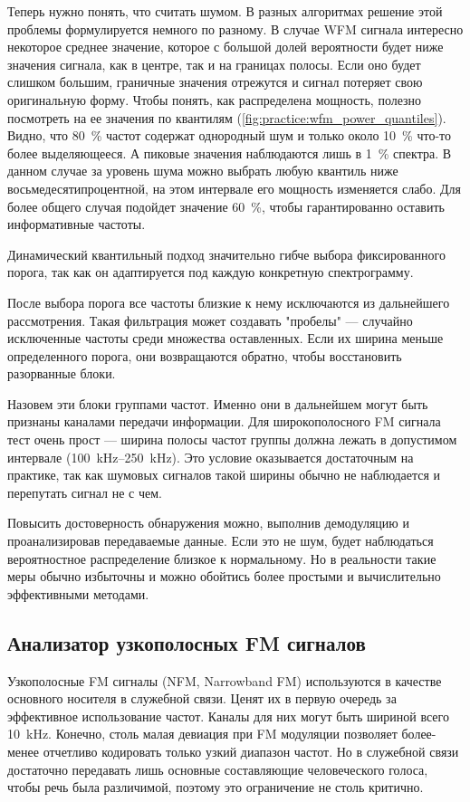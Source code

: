 Теперь нужно понять, что считать шумом. В разных алгоритмах решение этой проблемы формулируется немного по разному. В случае WFM сигнала интересно некоторое среднее значение, которое с большой долей вероятности будет ниже значения сигнала, как в центре, так и на границах полосы. Если оно будет слишком большим, граничные значения отрежутся и сигнал потеряет свою оригинальную форму. Чтобы понять, как распределена мощность, полезно посмотреть на ее значения по квантилям (\autoref{fig:practice:wfm_power_quantiles}). Видно, что \SI{80}{\percent} частот содержат однородный шум и только около \SI{10}{\percent} что-то более выделяющееся. А пиковые значения наблюдаются лишь в \SI{1}{\percent} спектра. В данном случае за уровень шума можно выбрать любую квантиль ниже восьмедесятипроцентной, на этом интервале его мощность изменяется слабо. Для более общего случая подойдет значение \SI{60}{\percent}, чтобы гарантированно оставить информативные частоты.

Динамический квантильный подход значительно гибче выбора фиксированного порога, так как он адаптируется под каждую конкретную спектрограмму.

После выбора порога все частоты близкие к нему исключаются из дальнейшего рассмотрения. Такая фильтрация может создавать "пробелы" --- случайно исключенные частоты среди множества оставленных. Если их ширина меньше определенного порога, они возвращаются обратно, чтобы восстановить разорванные блоки.

Назовем эти блоки группами частот. Именно они в дальнейшем могут быть признаны каналами передачи информации. Для широкополосного FM сигнала тест очень прост --- ширина полосы частот группы должна лежать в допустимом интервале (\SIrange{100}{250}{\kilo\hertz}). Это условие оказывается достаточным на практике, так как шумовых сигналов такой ширины обычно не наблюдается и перепутать сигнал не с чем.

Повысить достоверность обнаружения можно, выполнив демодуляцию и проанализировав передаваемые данные. Если это не шум, будет наблюдаться вероятностное распределение близкое к нормальному. Но в реальности такие меры обычно избыточны и можно обойтись более простыми и вычислительно эффективными методами.


\subsection{Анализатор узкополосных FM сигналов}

Узкополосные FM сигналы (NFM, Narrowband FM) используются в качестве основного носителя в служебной связи.
Ценят их в первую очередь за эффективное использование частот. Каналы для них могут быть шириной всего \SI{10}{\kilo\hertz}. Конечно, столь малая девиация при FM модуляции позволяет более-менее отчетливо кодировать только узкий диапазон частот. Но в служебной связи достаточно передавать лишь основные составляющие человеческого голоса, чтобы речь была различимой, поэтому это ограничение не столь критично.

